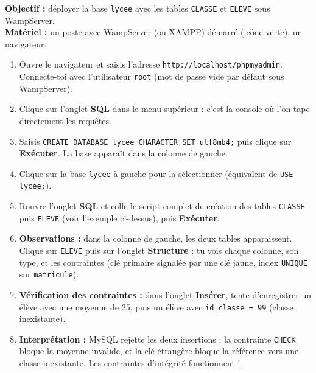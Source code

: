 \documentclass[11pt]{article}
\begin{document}
\begin{experience}
\textbf{Objectif :} déployer la base \texttt{lycee} avec les tables \texttt{CLASSE} et \texttt{ELEVE} sous WampServer.\\
\textbf{Matériel :} un poste avec WampServer (ou XAMPP) démarré (icône verte), un navigateur.
\begin{enumerate}
  \item Ouvre le navigateur et saisis l'adresse \texttt{http://localhost/phpmyadmin}. Connecte-toi avec l'utilisateur \texttt{root} (mot de passe vide par défaut sous WampServer).
  \item Clique sur l'onglet \textbf{SQL} dans le menu supérieur : c'est la console où l'on tape directement les requêtes.
  \item Saisis \texttt{CREATE DATABASE lycee CHARACTER SET utf8mb4;} puis clique sur \textbf{Exécuter}. La base apparaît dans la colonne de gauche.
  \item Clique sur la base \texttt{lycee} à gauche pour la sélectionner (équivalent de \texttt{USE lycee;}).
  \item Rouvre l'onglet \textbf{SQL} et colle le script complet de création des tables \texttt{CLASSE} puis \texttt{ELEVE} (voir l'exemple ci-dessus), puis \textbf{Exécuter}.
  \item \textbf{Observations :} dans la colonne de gauche, les deux tables apparaissent. Clique sur \texttt{ELEVE} puis sur l'onglet \textbf{Structure} : tu vois chaque colonne, son type, et les contraintes (clé primaire signalée par une clé jaune, index \texttt{UNIQUE} sur \texttt{matricule}).
  \item \textbf{Vérification des contraintes :} dans l'onglet \textbf{Insérer}, tente d'enregistrer un élève avec une moyenne de 25, puis un élève avec \texttt{id\_classe = 99} (classe inexistante).
  \item \textbf{Interprétation :} MySQL rejette les deux insertions : la contrainte \texttt{CHECK} bloque la moyenne invalide, et la clé étrangère bloque la référence vers une classe inexistante. Les contraintes d'intégrité fonctionnent !
\end{enumerate}
\end{experience}
\end{document}
